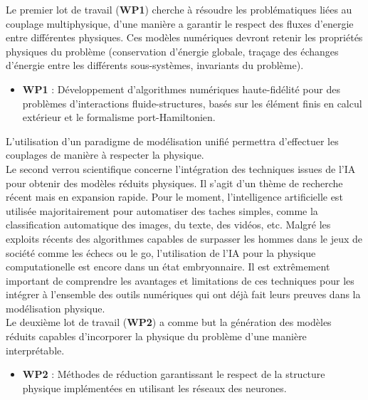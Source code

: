 \documentclass[12pt, french]{article}
\begin{document}
	Le premier lot de travail (\textbf{WP1}) cherche à résoudre les problématiques liées au couplage multiphysique, d'une manière a garantir le respect des fluxes d'energie entre différentes physiques. Ces modèles numériques devront retenir les propriétés physiques du problème (conservation d’énergie globale, traçage des échanges d’énergie entre les différents sous-systèmes, invariants du problème). \\
	
	\begin{itemize}
		\item \textbf{WP1} : Développement d'algorithmes numériques haute-fidélité pour des problèmes d'interactions fluide-structures, basés sur les élément finis en calcul extérieur et le formalisme port-Hamiltonien. \\
	\end{itemize}
	
	L’utilisation d’un paradigme de modélisation unifié permettra d’effectuer les couplages de manière à respecter la physique.\\
	
	Le second verrou scientifique concerne l'intégration des techniques issues de l'IA pour obtenir des modèles réduits physiques. Il s'agit d'un thème de recherche récent mais en expansion rapide. Pour le moment, l'intelligence artificielle est utilisée majoritairement pour automatiser des taches simples, comme la classification automatique des images, du texte, des vidéos, etc. Malgré les exploits récents des algorithmes capables de surpasser les hommes dans le jeux de société comme les échecs ou le go, l'utilisation de l'IA pour la physique computationelle est encore dans un état embryonnaire. Il est extrêmement important de comprendre les avantages et limitations de ces techniques pour les intégrer à l'ensemble des outils numériques qui ont déjà fait leurs preuves dans la modélisation physique. \\
	
	Le deuxième lot de travail (\textbf{WP2}) a comme but la génération des modèles réduits capables d'incorporer la physique du problème d'une manière interprétable. \\
	
	\begin{itemize}
		\item \textbf{WP2} : Méthodes de réduction garantissant le respect de la structure physique implémentées en utilisant les réseaux des neurones.\\
	\end{itemize}
	
\end{document}
